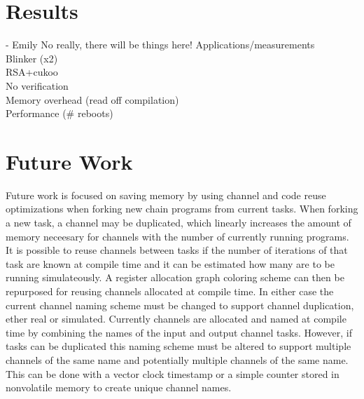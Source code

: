 \documentclass[11pt]{sensys-proc}
\begin{document}
\section{Results} - Emily
No really, there will be things here!
Applications/measurements\\
Blinker (x2)\\
RSA+cukoo\\
No verification\\
Memory overhead (read off compilation)\\
Performance (\# reboots)\\


\section{Future Work}
Future work is focused on saving memory by using channel and code reuse optimizations when forking new chain programs from current tasks. 
When forking a new task, a channel may be duplicated, which linearly increases the amount of memory neceesary for channels with the number of currently running programs.
It is possible to reuse channels between tasks if the number of iterations of that task are known at compile time and it can be estimated how 
many are to be running simulateously. A register allocation graph coloring scheme can then be repurposed for reusing channels allocated at compile time.
In either case the current channel naming scheme must be changed to support channel duplication, ether real or simulated.
Currently channels are allocated and named at compile time by combining the names of the input and output channel tasks. 
However, if tasks can be duplicated this naming scheme must be altered to support multiple channels of the same name and potentially multiple channels of the same name.
This can be done with a vector clock timestamp or a simple counter stored in nonvolatile memory to create unique channel names.
\end{document}
